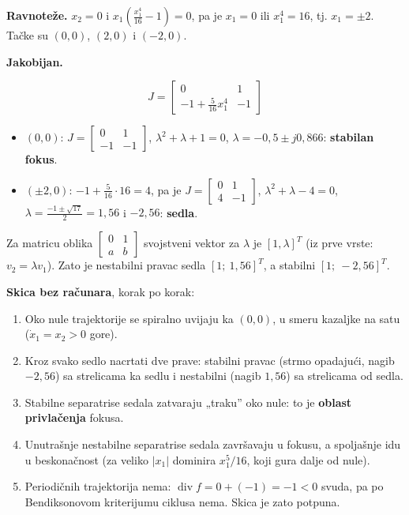 \documentclass[11pt,a4paper,parskip=half,headsepline,numbers=noenddot]{scrartcl}
\begin{document}
\textbf{Ravnoteže.} \(x_2 = 0\) i \(x_1\left(\frac{x_1^4}{16} - 1\right) = 0\), pa je \(x_1 = 0\) ili \(x_1^4 = 16\), tj. \(x_1 = \pm 2\). Tačke su \((0, 0)\), \((2, 0)\) i \((-2, 0)\).

\textbf{Jakobijan.}

\[J = \begin{bmatrix} 0 & 1\\ -1 + \frac{5}{16}x_1^4 & -1\end{bmatrix}\]

\begin{itemize}
\item \((0, 0)\): \(J = \begin{bmatrix}0 & 1\\ -1 & -1\end{bmatrix}\), \(\lambda^2 + \lambda + 1 = 0\), \(\lambda = -0{,}5 \pm j0{,}866\): \textbf{stabilan fokus}.
\item \((\pm 2, 0)\): \(-1 + \frac{5}{16}\cdot 16 = 4\), pa je \(J = \begin{bmatrix}0 & 1\\ 4 & -1\end{bmatrix}\), \(\lambda^2 + \lambda - 4 = 0\), \(\lambda = \frac{-1 \pm \sqrt{17}}{2} = 1{,}56\) i \(-2{,}56\): \textbf{sedla}.
\end{itemize}

Za matricu oblika \(\begin{bmatrix}0 & 1\\ a & b\end{bmatrix}\) svojstveni vektor za \(\lambda\) je \([1, \lambda]^T\) (iz prve vrste: \(v_2 = \lambda v_1\)). Zato je nestabilni pravac sedla \([1;\ 1{,}56]^T\), a stabilni \([1;\ -2{,}56]^T\).

\textbf{Skica bez računara}, korak po korak:

\begin{enumerate}
\def\labelenumi{\arabic{enumi}.}
\item Oko nule trajektorije se spiralno uvijaju ka \((0,0)\), u smeru kazaljke na satu (\(\dot x_1 = x_2 > 0\) gore).
\item Kroz svako sedlo nacrtati dve prave: stabilni pravac (strmo opadajući, nagib \(-2{,}56\)) sa strelicama ka sedlu i nestabilni (nagib \(1{,}56\)) sa strelicama od sedla.
\item Stabilne separatrise sedala zatvaraju „traku'' oko nule: to je \textbf{oblast privlačenja} fokusa.
\item Unutrašnje nestabilne separatrise sedala završavaju u fokusu, a spoljašnje idu u beskonačnost (za veliko \(|x_1|\) dominira \(x_1^5/16\), koji gura dalje od nule).
\item Periodičnih trajektorija nema: \(\operatorname{div} f = 0 + (-1) = -1 < 0\) svuda, pa po Bendiksonovom kriterijumu ciklusa nema. Skica je zato potpuna.
\end{enumerate}
\end{document}
